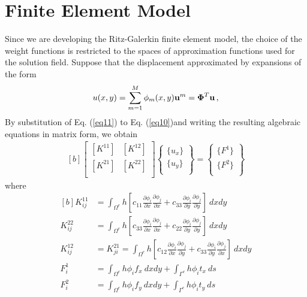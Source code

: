 \documentclass[]{article}
\begin{document}
\section{Finite Element Model} \label{sec: fem}
Since we are developing the Ritz-Galerkin finite element model, the choice of the weight functions is restricted to the spaces of approximation functions used for the solution field. Suppose that the displacement approximated by expansions of the form
\begin{equation}\label{eq11}
	\begin{aligned}
		u(x,y)= \sum_{m=1}^{M} \phi_m(x,y) \mathbf{u}^m= \boldsymbol{\Phi}^T\mathbf{u} \thinspace,
	\end{aligned}
\end{equation}
By substitution of Eq. (\ref{eq11}) to Eq. (\ref{eq10})and writing the resulting algebraic equations in matrix form, we obtain
\begin{equation}\label{eq12}
	\begin{aligned}[b]
		\begin{bmatrix}
			[K^{11}] & [K^{12}]\\
			[K^{21}] & [K^{22}]\\
		\end{bmatrix}
		\begin{Bmatrix}
			\{u_x\}\\
			\{u_y\}\\
		\end{Bmatrix}
		= \begin{Bmatrix}
			\{F^1\}\\
			\{F^2\}\\
		\end{Bmatrix}
	\end{aligned}
\end{equation}
where
\begin{equation}\label{eq13}
	\begin{aligned}[b]
		K^{11}_{ij} &= \int_{\Omega^e} h \left[c_{11}\frac{\partial \phi_i}{\partial x}\frac{\partial \phi_j}{\partial x} +c_{33}\frac{\partial \phi_i}{\partial y}\frac{\partial \phi_j}{\partial y}\right]  \ dxdy\\
		K^{22}_{ij} &= \int_{\Omega^e} h \left[c_{33}\frac{\partial \phi_i}{\partial x}\frac{\partial \phi_j}{\partial x} +c_{22}\frac{\partial \phi_i}{\partial y}\frac{\partial \phi_j}{\partial y}\right]  \ dxdy\\
		K^{12}_{ij} &= K^{21}_{ji} = \int_{\Omega^e} h \left[c_{12}\frac{\partial \phi_i}{\partial x}\frac{\partial \phi_j}{\partial y} +c_{33}\frac{\partial \phi_i}{\partial y}\frac{\partial \phi_j}{\partial x}\right]  \ dxdy\\
		F^{1}_{i} &= \int_{\Omega^e} h \phi_i f_x \ dxdy +\int_{\Gamma^e} h \phi_i t_x \ ds\\
		F^{2}_{i} &= \int_{\Omega^e} h \phi_i f_y \ dxdy +\int_{\Gamma^e} h \phi_i t_y \ ds\\
	\end{aligned}
\end{equation}
\end{document}
